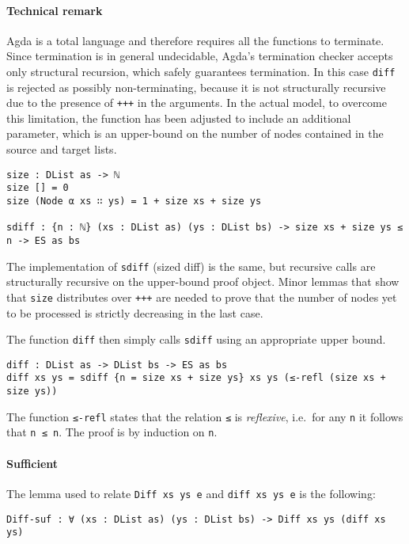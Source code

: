 \documentclass[../Thesis.tex]{subfiles}
\begin{document}
	\paragraph{Technical remark}
	Agda is a total language and therefore requires all the functions to 
	terminate. Since termination is in general undecidable, Agda's termination 
	checker accepts only structural recursion, which safely guarantees
	termination. In this case \texttt{diff} is rejected as possibly 
	non-terminating, because it is not structurally recursive
	due to the presence of \texttt{+++} in the arguments. 
	In the actual model, to overcome this limitation, the function has been 
	adjusted to include an additional parameter, which is an upper-bound 
	on the number of nodes contained in the source and target lists.
	
\begin{verbatim}
size : DList as -> ℕ 
size [] = 0
size (Node α xs ∷ ys) = 1 + size xs + size ys

sdiff : {n : ℕ} (xs : DList as) (ys : DList bs) -> size xs + size ys ≤ n -> ES as bs
\end{verbatim}
	
	The implementation of \texttt{sdiff} (sized diff) is the same, but recursive 
	calls	are structurally recursive on the upper-bound proof object.
	Minor lemmas that show that \texttt{size} distributes over \texttt{+++}
	are needed to prove that the number of nodes yet to be processed
	is strictly decreasing in the last case.

	The function \texttt{diff} then simply calls \texttt{sdiff} using an appropriate
	upper bound.
		
\begin{verbatim}
diff : DList as -> DList bs -> ES as bs
diff xs ys = sdiff {n = size xs + size ys} xs ys (≤-refl (size xs + size ys))
\end{verbatim}

	The function \texttt{≤-refl} states that the relation \texttt{≤} is 
	\emph{reflexive}, i.e.\ for any \texttt{n} it follows that \texttt{n ≤ n}.
	The proof is by induction on \texttt{n}.	 

	\paragraph{Sufficient}
	The lemma used to relate \texttt{Diff xs ys e} and \texttt{diff xs ys e} 
	is the following:
\begin{verbatim}	
Diff-suf : ∀ (xs : DList as) (ys : DList bs) -> Diff xs ys (diff xs ys)
\end{verbatim}
\end{document}
